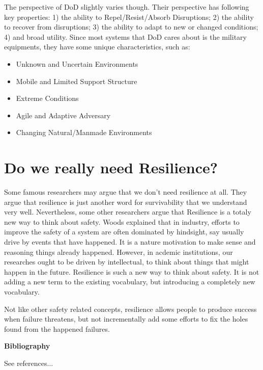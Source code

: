 \documentclass[11pt]{article}
\begin{document}
The perspective of DoD slightly varies though. Their perspective has following key properties: 1) the ability to Repel/Resist/Absorb Disruptions; 2) the ability to recover from disruptions; 3) the ability to adapt to new or changed conditions; 4) and broad utility. Since most systems that DoD cares about is the military equipments, they have some unique characteristics, such as:
\begin{itemize}
\item Unknown and Uncertain Environments
\item Mobile and Limited Support Structure
\item Extreme Conditions
\item Agile and Adaptive Adversary
\item Changing Natural/Manmade Environments
\end{itemize}



\section{Do we really need Resilience?}
Some famous researchers may argue that we don't need resilience at all. They argue that resilience is just another word for survivability that we understand very well. Nevertheless, some other researchers argue that Resilience is a totaly new way to think about safety. Woods \cite{Woods2006} explained that in industry, efforts to improve the safety of a system are often dominated by hindsight, say usually drive by events that have happened. It is a nature motivation to make sense and reasoning things already happened. However, in acdemic institutions, our researches ought to be driven by intellectual, to think about things that might happen in the future. Resilience is such a new way to think about safety. It is not adding a new term to the existing vocabulary, but introducing a completely new vocabulary.

Not like other safety related concepts, resilience allows people to produce success when failure threatens, but not incrementally add some efforts to fix the holes found from the happened failures.


\begin{center}
  {\Large \bf Bibliography}
\end{center}
See references...
\nocite{*}
\end{document}
